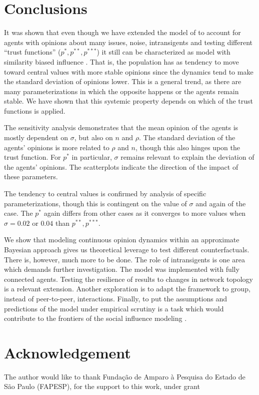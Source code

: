 \documentclass{article}
\begin{document}
  \section{Conclusions}

    It was shown that even though we have extended the model of
    \cite{martins08c} to account for agents with opinions about many issues,
    noise, intransigents and testing different ``trust functions'' (\(p^*,
    p^{**}, p^{***}\)) it still can be characterized as model with similarity
    biased influence \cite{flache2017}. That is, the population has as tendency
    to move toward central values with more stable opinions since the dynamics
    tend to make the standard deviation of opinions lower. This is a general
    trend, as there are many parameterizations in which the opposite happens or
    the agents remain stable. We have shown that this systemic property depends
    on which of the trust functions is applied.

    The sensitivity analysis demonstrates that the mean opinion of the agents is
    mostly dependent on \(\sigma\), but also on \(n\) and \(\rho\). The standard
    deviation of the agents' opinions is more related to \(\rho\) and \(n\),
    though this also hinges upon the trust function. For \(p^*\) in particular,
    \(\sigma\) remains relevant to explain the deviation of the agents'
    opinions. The scatterplots indicate the direction of the impact of these
    parameters.

    The tendency to central values is confirmed by analysis of specific
    parameterizations, though this is contingent on the value of \(\sigma\) and
    again of the case. The \(p^*\) again differs from other cases as it
    converges to more values when \(\sigma = 0.02\) or \(0.04\) than \(p^{**},
    p^{***}\).

    We show that modeling continuous opinion dynamics within an approximate
    Bayesian approach \cite{martins08a, martins08c} gives us theoretical
    leverage to test different counterfactuals. There is, however, much more to
    be done. The role of intransigents is one area which demands further
    investigation. The model was implemented with fully connected agents.
    Testing the resilience of results to changes in network topology is a
    relevant extension. Another exploration is to adapt the framework to group,
    instead of peer-to-peer, interactions. Finally, to put the assumptions and
    predictions of the model under empirical scrutiny is a task which would
    contribute to the frontiers of the social influence modeling
    \cite{flache2017}.

\section{Acknowledgement}
The author would like to thank Funda\c{c}\~ao de Amparo \`a Pesquisa do Estado de S\~ao Paulo (FAPESP), for the support to this work, under grant %



\end{document}
